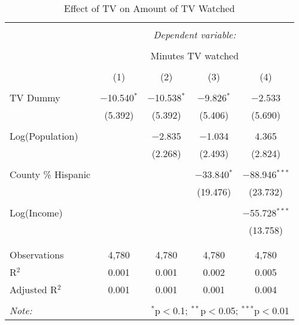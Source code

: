 
\begin{table}[!htbp] \centering 
  \caption{Effect of TV on Amount of TV Watched} 
  \label{} 
\begin{tabular}{@{\extracolsep{-5pt}}lcccc} 
\\[-1.8ex]\hline 
\hline \\[-1.8ex] 
 & \multicolumn{4}{c}{\textit{Dependent variable:}} \\ 
\cline{2-5} 
\\[-1.8ex] & \multicolumn{4}{c}{Minutes TV watched} \\ 
\\[-1.8ex] & (1) & (2) & (3) & (4)\\ 
\hline \\[-1.8ex] 
 TV Dummy & $-$10.540$^{*}$ & $-$10.538$^{*}$ & $-$9.826$^{*}$ & $-$2.533 \\ 
  & (5.392) & (5.392) & (5.406) & (5.690) \\ 
  & & & & \\ 
 Log(Population) &  & $-$2.835 & $-$1.034 & 4.365 \\ 
  &  & (2.268) & (2.493) & (2.824) \\ 
  & & & & \\ 
 County \% Hispanic &  &  & $-$33.840$^{*}$ & $-$88.946$^{***}$ \\ 
  &  &  & (19.476) & (23.732) \\ 
  & & & & \\ 
 Log(Income) &  &  &  & $-$55.728$^{***}$ \\ 
  &  &  &  & (13.758) \\ 
  & & & & \\ 
\hline \\[-1.8ex] 
Observations & 4,780 & 4,780 & 4,780 & 4,780 \\ 
R$^{2}$ & 0.001 & 0.001 & 0.002 & 0.005 \\ 
Adjusted R$^{2}$ & 0.001 & 0.001 & 0.001 & 0.004 \\ 
\hline 
\hline \\[-1.8ex] 
\textit{Note:}  & \multicolumn{4}{r}{$^{*}$p$<$0.1; $^{**}$p$<$0.05; $^{***}$p$<$0.01} \\ 
\end{tabular} 
\end{table} 
